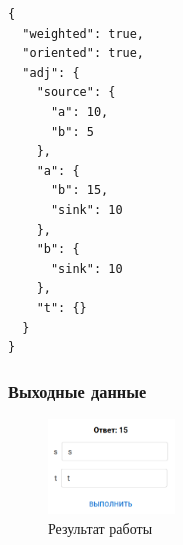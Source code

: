 \begin{verbatim}
{
  "weighted": true,
  "oriented": true,
  "adj": {
    "source": {
      "a": 10,
      "b": 5
    },
    "a": {
      "b": 15,
      "sink": 10
    },
    "b": {
      "sink": 10
    },
    "t": {}
  }
}
\end{verbatim}

\subsubsection{Выходные данные}
\begin{figure}[H]
  \centering\includegraphics[width=0.3\textwidth]{figs/task-11/res-ff-2.png}
  \caption{Результат работы}
\end{figure}

